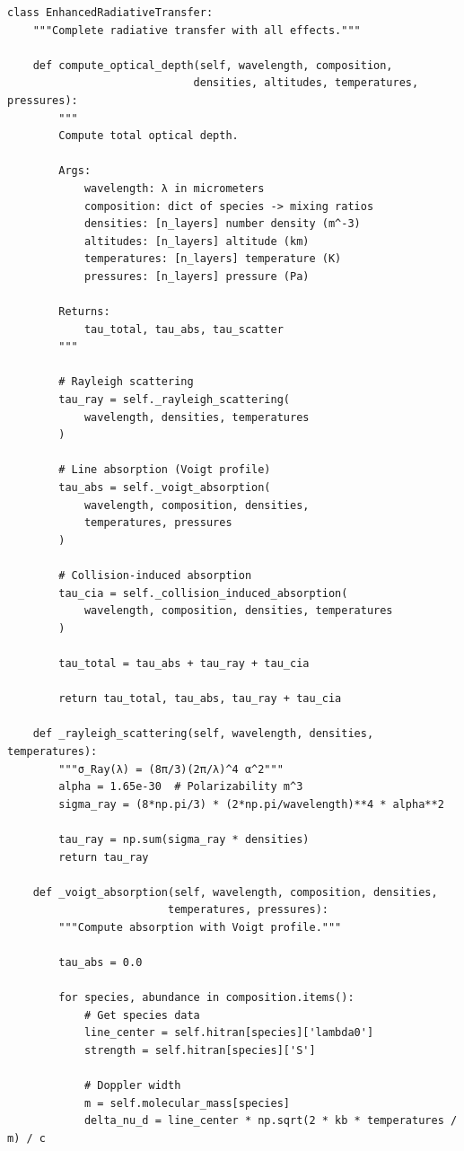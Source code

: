 \documentclass[12pt,a4paper,oneside]{report}
\begin{document}
\begin{lstlisting}
class EnhancedRadiativeTransfer:
    """Complete radiative transfer with all effects."""

    def compute_optical_depth(self, wavelength, composition,
                             densities, altitudes, temperatures, pressures):
        """
        Compute total optical depth.

        Args:
            wavelength: λ in micrometers
            composition: dict of species -> mixing ratios
            densities: [n_layers] number density (m^-3)
            altitudes: [n_layers] altitude (km)
            temperatures: [n_layers] temperature (K)
            pressures: [n_layers] pressure (Pa)

        Returns:
            tau_total, tau_abs, tau_scatter
        """

        # Rayleigh scattering
        tau_ray = self._rayleigh_scattering(
            wavelength, densities, temperatures
        )

        # Line absorption (Voigt profile)
        tau_abs = self._voigt_absorption(
            wavelength, composition, densities,
            temperatures, pressures
        )

        # Collision-induced absorption
        tau_cia = self._collision_induced_absorption(
            wavelength, composition, densities, temperatures
        )

        tau_total = tau_abs + tau_ray + tau_cia

        return tau_total, tau_abs, tau_ray + tau_cia

    def _rayleigh_scattering(self, wavelength, densities, temperatures):
        """σ_Ray(λ) = (8π/3)(2π/λ)^4 α^2"""
        alpha = 1.65e-30  # Polarizability m^3
        sigma_ray = (8*np.pi/3) * (2*np.pi/wavelength)**4 * alpha**2

        tau_ray = np.sum(sigma_ray * densities)
        return tau_ray

    def _voigt_absorption(self, wavelength, composition, densities,
                         temperatures, pressures):
        """Compute absorption with Voigt profile."""

        tau_abs = 0.0

        for species, abundance in composition.items():
            # Get species data
            line_center = self.hitran[species]['lambda0']
            strength = self.hitran[species]['S']

            # Doppler width
            m = self.molecular_mass[species]
            delta_nu_d = line_center * np.sqrt(2 * kb * temperatures / m) / c


\end{lstlisting}
\end{document}
